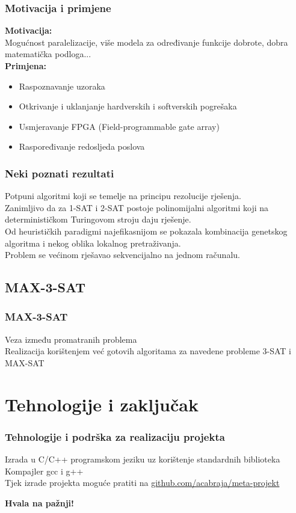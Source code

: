 \documentclass{beamer}
\begin{document}
\begin{frame}
 \frametitle{Motivacija i primjene}
 \textbf{Motivacija:}\\
 Mogućnost paralelizacije, više modela za određivanje funkcije dobrote, dobra matematička podloga...\\
 \textbf{Primjena:}
 \begin{itemize}
 \item Raspoznavanje uzoraka\\
 \item Otkrivanje i uklanjanje hardverskih i softverskih pogrešaka\\
 \item Usmjeravanje FPGA (Field-programmable gate array)\\
 \item Raspoređivanje redosljeda poslova 
 \end{itemize}
\end{frame}

\begin{frame}
 \frametitle{Neki poznati rezultati}
 Potpuni algoritmi koji se temelje na principu rezolucije rješenja.\\
 Zanimljivo da za 1-SAT i 2-SAT postoje polinomijalni algoritmi koji na determinističkom Turingovom stroju daju rješenje.\\
 Od heurističkih paradigmi najefikasnijom se pokazala kombinacija genetskog algoritma i nekog oblika lokalnog pretraživanja.\\
 Problem se većinom rješavao sekvencijalno na jednom računalu.
\end{frame}



\subsection{MAX-3-SAT}
\begin{frame}
 \frametitle{MAX-3-SAT}
 Veza između promatranih problema \\
 Realizacija korištenjem već gotovih algoritama za navedene probleme 3-SAT i MAX-SAT
\end{frame}

\section{Tehnologije i zaključak}
\begin{frame}
 \frametitle{Tehnologije i podrška za realizaciju projekta}
 Izrada u C/C++ programskom jeziku uz korištenje standardnih biblioteka \\
 Kompajler gcc i g++\\
 Tjek izrade projekta moguće pratiti na \url{ github.com/acabraja/meta-projekt}
\end{frame}

\begin{frame}
 \begin{center}
  \textbf{Hvala na pažnji!}
 \end{center}
\end{frame}
\end{document}
